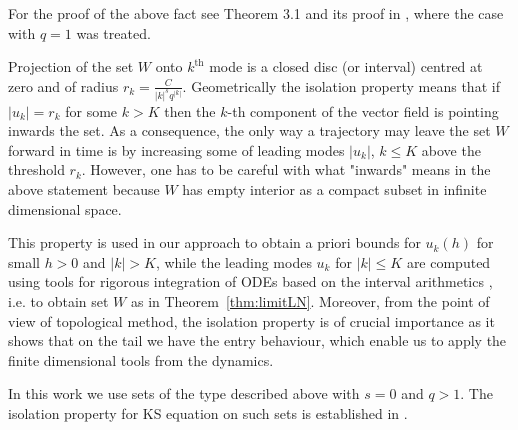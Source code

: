 For the proof of  the above fact see Theorem 3.1 and its proof in \cite{ZKS3}, where the case with $q=1$ was treated.

Projection of the set $W$ onto $k^{\mathrm{th}}$ mode is a closed disc (or interval) centred at zero and of radius
$r_k =\frac{C}{|k|^s q^{|k|}}$. Geometrically the isolation property means that if $|u_k|=r_k$ for some $k> K$ then the $k$-th component of the vector field is pointing inwards the set. As a consequence, the only way a trajectory may leave the set $W$ forward in time is by increasing some of leading modes $|u_k|$, $k\leq K$ above the threshold $r_k$. However, one has to be careful with what "inwards" means in the above statement because $W$ has empty interior as a compact subset in infinite dimensional space.


This property is used   in  our approach to obtain a priori bounds for $u_k(h)$ for small $h>0$ and $|k|>K$, while the leading modes $u_k$ for $|k| \leq K$ are computed using  tools for rigorous integration of ODEs \cite{CAPDREVIEW,Lo,NJP} based on the interval arithmetics \cite{Mo}, i.e. to obtain set $W$ as in Theorem~\ref{thm:limitLN}. Moreover, from the point of view of topological method, the isolation property is of crucial importance as it shows that on the tail we have the entry behaviour, which enable us to apply the finite dimensional tools from the dynamics.


In this work we use sets of the type described above with $s=0$ and $q>1$. The isolation property for KS equation on such sets is established in \cite[Rem. 19]{WZ}.
